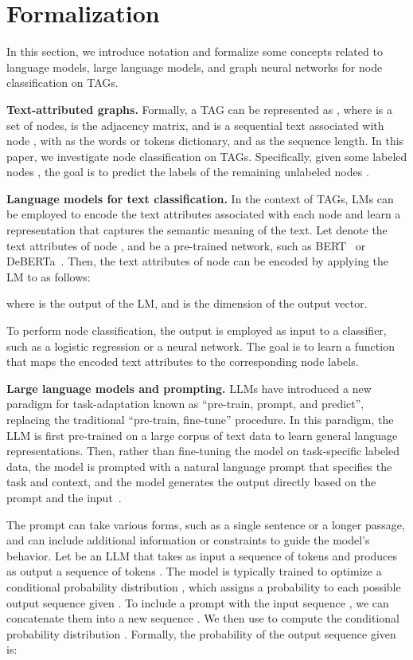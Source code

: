 \documentclass{article}
\begin{document}
\section{Formalization}

In this section, we introduce notation and formalize some concepts related to language models, large language models, and graph neural networks for node classification on TAGs.

\textbf{Text-attributed graphs.}
Formally, a TAG can be represented as , where  is a set of  nodes,  is the adjacency matrix, and  is a sequential text associated with node , with  as the words or tokens dictionary, and  as the sequence length. 
In this paper, we investigate node classification on TAGs.  Specifically, given some labeled nodes  , the goal is to predict the labels of the remaining unlabeled nodes .

\textbf{Language models for text classification.}
In the context of TAGs,  LMs can be employed to encode the text attributes associated with each node and learn a representation that captures the semantic meaning of the text. Let  denote the text attributes of node , and  be a pre-trained network, such as BERT~\citep{devlin2018bert} or DeBERTa~\citep{he2021deberta}. Then, the text attributes of node  can be encoded by applying the LM to  as follows:

where  is the output of the LM, and  is the dimension of the output vector.

To perform node classification, the output is employed as input to a classifier, such as a logistic regression or a neural network. The goal is to learn a function that maps the encoded text attributes to the corresponding node labels. 

\textbf{Large language models and prompting.}
LLMs have introduced a new paradigm for task-adaptation known as ``pre-train, prompt, and predict'', replacing the traditional ``pre-train, fine-tune'' procedure. In this paradigm, the LLM is first pre-trained on a large corpus of text data to learn general language representations. Then, rather than fine-tuning the model on task-specific labeled data, the model is prompted with a natural language prompt that specifies the task and context, and the model generates the output directly based on the prompt and the input~\citep{liu2023pre_survey}.


The prompt can take various forms, such as a single sentence or a longer passage, and can include additional information or constraints to guide the model's behavior. Let  be an LLM that takes as input a sequence of tokens  and produces as output a sequence of tokens . The model  is typically trained to optimize a conditional probability distribution , which assigns a probability to each possible output sequence  given . To include a prompt  with the input sequence , we can concatenate them into a new sequence . We then use  to compute the conditional probability distribution . Formally, the probability of the output sequence  given  is:
\end{document}
